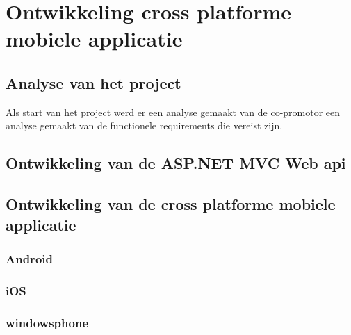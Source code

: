 \chapter{Ontwikkeling cross platforme mobiele applicatie}
\label{ch:ontwikkelingcrossplatformapp}
\section{Analyse van het project}
Als start van het project werd er een analyse gemaakt van de co-promotor
een analyse gemaakt van de functionele requirements die vereist zijn.

\section{Ontwikkeling van de ASP.NET MVC Web api}
\section{Ontwikkeling van de cross platforme mobiele applicatie}
\subsection{Android}
\subsection{iOS}
\subsection{windowsphone}
